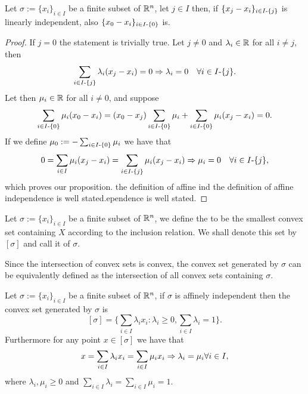 \documentclass[../1.tex]{subfiles}
\begin{document}
    \begin{prop}
        Let $\sigma := \{x_i\}_{i \in I}$ be a finite subset of $\mathbb{R}^n$, let $j \in I$ then, if $\{ x_j - x_i\}_{i \in I \text{-} \{j\}}$ is linearly independent,
        also $\{ x_0 - x_i\}_{i \in I \text{-} \{0\}}$ is. 
    \end{prop}
    \begin{proof}
        If $j=0$ the statement is trivially true. Let $j \neq 0$ and $\lambda_i \in \mathbb{R}$ for all $i \neq j$, then
        \[ \sum_{i \in I \text{-} \{j\}} \lambda_i (x_j - x_i) = 0 \Rightarrow \lambda_i = 0 \quad \forall i \in I \text{-} \{j\}.\]
        Let then $\mu_i \in \mathbb{R}$ for all $i \neq 0$, and suppose 
        \[ \sum_{i \in I \text{-} \{0\}} \mu_i (x_0 - x_i) = (x_0 - x_j) \sum_{i \in I \text{-} \{0\}} \mu_i + \sum_{i \in I \text{-} \{0\}} \mu_i (x_j - x_i) = 0.\]
        If we define $\mu_0 := -\sum_{i \in I \text{-} \{0\}} \mu_i$ we have that
        \[ 0 = \sum_{i \in I} \mu_i (x_j - x_i) = \sum_{i \in I \text{-} \{j\}} \mu_i (x_j - x_i) \Rightarrow \mu_i = 0 \quad \forall i \in I \text{-} \{j\},\]
        which proves our proposition. the definition of affine ind the definition of affine independence is well stated.ependence is well stated.
    \end{proof}

    \begin{defn}
        Let $\sigma := \{x_i\}_{i \in I}$ be a finite subset of $\mathbb{R}^n$, we define the  to be 
        the smallest convex set containing $X$ according to the inclusion relation. We shall denote this set by $[\sigma]$ and call 
        it  of $\sigma$.
    \end{defn}

    Since the intersection of convex sets is convex, the convex set generated by $\sigma$ can be equivalently defined as the intersection 
    of all convex sets containing $\sigma$.

    \begin{thm}
        Let $\sigma := \{x_i\}_{i \in I}$ be a finite subset of $\mathbb{R}^n$, if $\sigma$ is affinely independent then the convex set generated by $\sigma$ is 
        \[ [\sigma] = \{ \sum_{i \in I} \lambda_i x_i : \lambda_i \geq 0, \sum_{i \in I} \lambda_i = 1\}. \]
        Furthermore for any point $x \in [\sigma]$ we have that
        \[ x = \sum_{i \in I} \lambda_i x_i = \sum_{i \in I} \mu_i x_i \Rightarrow \lambda_i = \mu_i \forall i \in I, \] 
        where $\lambda_i,\mu_i \geq 0$ and $\sum_{i \in I} \lambda_i = \sum_{i \in I} \mu_i =1$.
        \label{thm:1}
    \end{thm}
\end{document}
